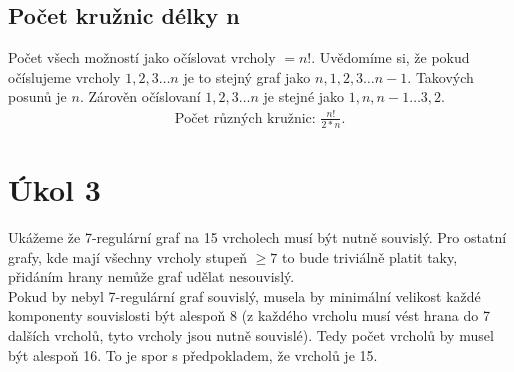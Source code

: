 \documentclass[a4paper]{article}
\begin{document}
\subsection{Počet kružnic délky n}
Počet všech možností jako očíslovat vrcholy $= n!$.
Uvědomíme si, že pokud očíslujeme vrcholy $1, 2, 3 \dots n$ je to stejný graf jako $n, 1, 2, 3 \dots n-1$.
Takových posunů je $n$. Zárověn očíslovaní $1, 2, 3 \dots n$ je stejné jako $1, n, n-1 \dots 3, 2$.
\begin{align*}
    \text{Počet různých kružnic: }
    \frac{n!}{2*n}
.\end{align*}

\section{Úkol 3}
Ukážeme že 7-regulární graf na 15 vrcholech musí být nutně souvislý.
Pro ostatní grafy, kde mají všechny vrcholy stupeň $\ge 7$ to bude triviálně platit taky, přidáním hrany nemůže graf udělat nesouvislý.
\\
Pokud by nebyl 7-regulární graf souvislý, musela by minimální velikost každé komponenty souvislosti být alespoň 8 (z každého vrcholu musí vést hrana do 7 dalších vrcholů, tyto vrcholy jsou nutně souvislé). Tedy počet vrcholů by musel být alespoň 16. To je spor s předpokladem, že vrcholů je 15.
\end{document}

